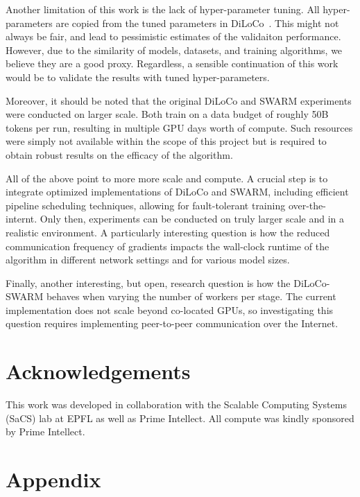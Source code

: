 \documentclass{article}
\begin{document}
Another limitation of this work is the lack of hyper-parameter tuning. All
hyper-parameters are copied from the tuned parameters in
DiLoCo~\cite{douillard2023diloco}. This might not always be fair, and lead to
pessimistic estimates of the validaiton performance. However, due to the
similarity of models, datasets, and training algorithms, we believe they are a
good proxy. Regardless, a sensible continuation of this work would be to
validate the results with tuned hyper-parameters.

Moreover, it should be noted that the original DiLoCo and SWARM experiments were
conducted on larger scale. Both train on a data budget of roughly 50B tokens per
run, resulting in multiple GPU days worth of compute. Such resources were simply
not available within the scope of this project but is required to obtain robust
results on the efficacy of the algorithm.

All of the above point to more more scale and compute. A crucial step is to
integrate optimized implementations of DiLoCo and SWARM, including efficient
pipeline scheduling techniques, allowing for fault-tolerant training over-the-
internt. Only then, experiments can be conducted on truly larger scale and in a
realistic environment. A particularly interesting question is how the reduced
communication frequency of gradients impacts the wall-clock runtime of the
algorithm in different network settings and for various model sizes.

Finally, another interesting, but open, research question is how the
DiLoCo-SWARM behaves when varying the number of workers per stage. The current
implementation does not scale beyond co-located GPUs, so investigating this
question requires implementing peer-to-peer communication over the Internet.

\section*{Acknowledgements}
\label{sec:acknowledgements}

This work was developed in collaboration with the Scalable Computing Systems
(SaCS) lab at EPFL as well as Prime Intellect. All compute was kindly sponsored
by Prime Intellect.




\newpage
\appendix
\onecolumn

\section{Appendix}
\end{document}
